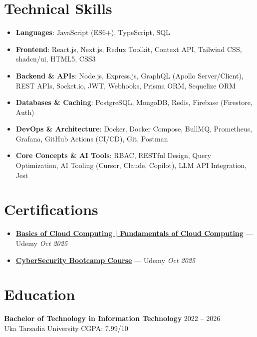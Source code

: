 \documentclass[10pt]{article}
\begin{document}
\section{Technical Skills}
\begin{itemize}[leftmargin=0.15in, label={}, noitemsep]
\item \textbf{Languages}: JavaScript (ES6+), TypeScript, SQL
\item \textbf{Frontend}: React.js, Next.js, Redux Toolkit, Context API, Tailwind CSS, shadcn/ui, HTML5, CSS3
\item \textbf{Backend \& APIs}: Node.js, Express.js, GraphQL (Apollo Server/Client), REST APIs, Socket.io, JWT, Webhooks, Prisma ORM, Sequelize ORM
\item \textbf{Databases \& Caching}: PostgreSQL, MongoDB, Redis, Firebase (Firestore, Auth)
\item \textbf{DevOps \& Architecture}: Docker, Docker Compose, BullMQ, Prometheus, Grafana, GitHub Actions (CI/CD), Git, Postman
\item \textbf{Core Concepts \& AI Tools}: RBAC, RESTful Design, Query Optimization, AI Tooling (Cursor, Claude, Copilot), LLM API Integration, Jest
\end{itemize}

  \section{Certifications}
  \begin{itemize}[leftmargin=0.15in, label={}, noitemsep]
    \item \href{https://www.udemy.com/certificate/UC-c12fca53-ef2a-493b-8431-a8d501dd73a0/}{\textbf{Basics of Cloud Computing | Fundamentals of Cloud Computing}} --- Udemy \hfill \textit{Oct 2025}
    \item \href{https://www.udemy.com/certificate/UC-c02c2081-b2a4-458d-89fd-e1c878dcb4f5/}{\textbf{CyberSecurity Bootcamp Course}} --- Udemy \hfill \textit{Oct 2025}
  \end{itemize}


\section{Education}
\textbf{Bachelor of Technology in Information Technology} \hfill 2022 -- 2026 \\
Uka Tarsadia University \hfill CGPA: 7.99/10
\end{document}
